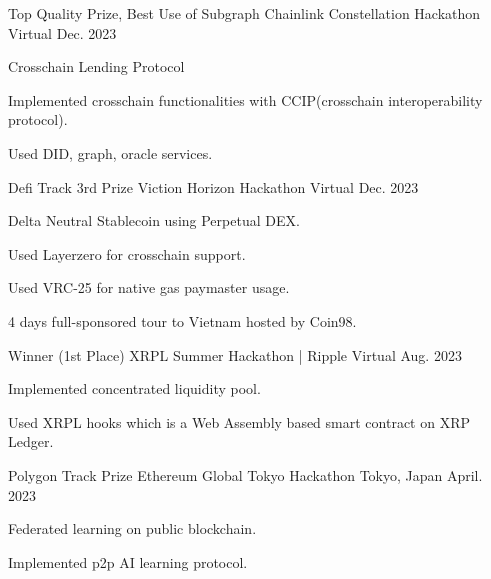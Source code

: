 




\begin{cventries}


\cventry
{Top Quality Prize, Best Use of Subgraph}
{Chainlink Constellation Hackathon}
{Virtual}
{Dec. 2023}
{
\begin{cvitems}
\item {Crosschain Lending Protocol}
\item {Implemented crosschain functionalities with CCIP(crosschain interoperability protocol).}
\item {Used DID, graph, oracle services.}
\end{cvitems}
}

\cventry
{Defi Track 3rd Prize}
{Viction Horizon Hackathon}
{Virtual}
{Dec. 2023}
{
\begin{cvitems}
\item {Delta Neutral Stablecoin using Perpetual DEX.}
\item {Used Layerzero for crosschain support.}
\item {Used VRC-25 for native gas paymaster usage.}
\item {4 days full-sponsored tour to Vietnam hosted by Coin98.}
\end{cvitems}
}

\cventry
{Winner (1st Place)} %
{XRPL Summer Hackathon | Ripple} %
{Virtual} %
{Aug. 2023} %
{
\begin{cvitems}
\item {Implemented concentrated liquidity pool.}
\item {Used XRPL hooks which is a Web Assembly based smart contract on XRP Ledger.}
\end{cvitems}
}

\cventry
{Polygon Track Prize} %
{Ethereum Global Tokyo Hackathon} %
{Tokyo, Japan} %
{April. 2023} %
{
\begin{cvitems}
\item {Federated learning on public blockchain.}
\item {Implemented p2p AI learning protocol.}
\end{cvitems}
}


\end{cventries}

